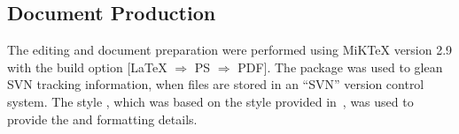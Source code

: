 
\subsection{Document Production}
\label{lab:ssec_DocumentProduction}

The editing and document preparation were performed using MiK\TeX{} version 2.9  with the build option $[$\LaTeX{}  $\Rightarrow$ PS $\Rightarrow$ PDF$]$.
The  package was used to glean SVN tracking information, when files are stored in an ``SVN'' version control system.
The style {\tt \KNEADdocumentClsName}, which was based on the style provided in~\cite{ref__thesisguide}, was used to provide the \LaTeXx and \Biberx formatting details.